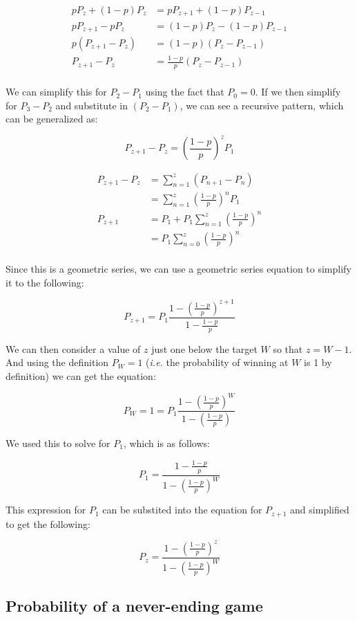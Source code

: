 \documentclass[]{article}
\begin{document}
\[
\begin{aligned}
pP_z + (1-p)P_z &= pP_{z+1} + (1-p)P_{z-1} \\
pP_{z+1} - pP_z &= (1-p)P_z - (1-p)P_{z-1} \\
p(P_{z+1} - P_z) &= (1-p)(P_z - P_{z-1}) \\
P_{z+1} - P_z &= \frac{1-p}{p}(P_z - P_{z-1}) \\
\end{aligned}
\]

We can simplify this for \(P_2 - P_1\) using the fact that \(P_0 = 0\).
If we then simplify for \(P_3 - P_2\) and substitute in \((P_2 - P_1)\),
we can see a recursive pattern, which can be generalized as:

\[P_{z+1} - P_z = (\frac{1-p}{p})^z P_1\]

\[
\begin{aligned}
P_{z+1} - P_z &= \sum_{n=1}^{z} (P_{n+1} - P_n) \\
              &= \sum_{n=1}^{z} (\frac{1-p}{p})^n P_1 \\
      P_{z+1} &= P_1 + P_1\sum_{n=1}^{z} (\frac{1-p}{p})^n \\
              &= P_1\sum_{n=0}^{z} (\frac{1-p}{p})^n \\
\end{aligned}
\]

Since this is a geometric series, we can use a geometric series equation
to simplify it to the following:

\[ P_{z+1} = P_1 \frac{1-(\frac{1-p}{p})^{z+1}}{1-\frac{1-p}{p}} \]

We can then consider a value of \(z\) just one below the target \(W\) so
that \(z = W - 1\). And using the definition \(P_W = 1\) (\emph{i.e.}
the probability of winning at \(W\) is 1 by definition) we can get the
equation:

\[ P_W = 1 = P_1 \frac{1-(\frac{1-p}{p})^W}{1-(\frac{1-p}{p})} \]

We used this to solve for \(P_1\), which is as follows:

\[ P_1 = \frac{1- \frac{1-p}{p}}{1 - (\frac{1-p}{p})^W} \]

This expression for \(P_1\) can be substited into the equation for
\(P_{z+1}\) and simplified to get the following:

\[ P_z =  \frac{1-(\frac{1-p}{p})^z}{1-(\frac{1-p}{p})^W} \]

\hypertarget{probability-of-a-never-ending-game}{%
\subsection{Probability of a never-ending
game}\label{probability-of-a-never-ending-game}}
\end{document}
